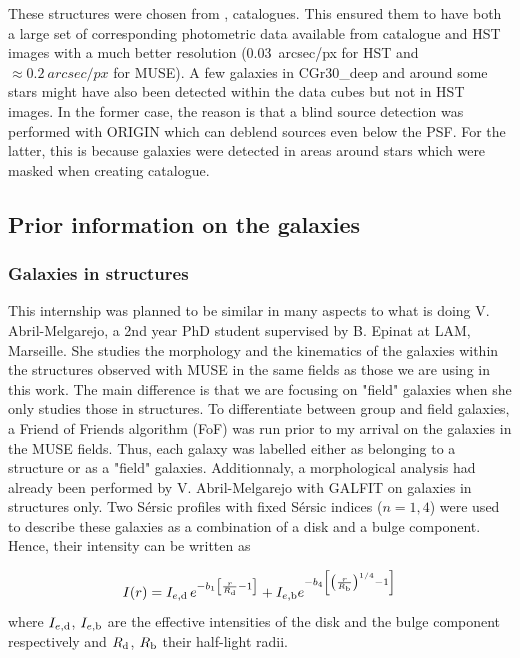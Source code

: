 These structures were chosen from ,  catalogues. This ensured them to have both a large set of corresponding photometric data available from  catalogue and HST images with a much better resolution (\SI{0.03}{arcsec/px} for HST and $\approx \SI{0.2}{arcsec/px}$ for MUSE). A few galaxies in CGr30\_deep and around some stars might have also been detected within the data cubes but not in HST images. In the former case, the reason is that a blind source detection was performed with ORIGIN  which can deblend sources even below the PSF. For the latter, this is because galaxies were detected in areas around stars which were masked when creating  catalogue.

\subsection{Prior information on the galaxies}

\subsubsection{Galaxies in structures}

This internship was planned to be similar in many aspects to what is doing V. Abril-Melgarejo, a 2nd year PhD student supervised by B. Epinat at LAM, Marseille. She studies the morphology and the kinematics of the galaxies within the structures observed with MUSE in the same fields as those we are using in this work. The main difference is that we are focusing on "field" galaxies when she only studies those in structures. To differentiate between group and field galaxies, a Friend of Friends algorithm (FoF) was run prior to my arrival on the galaxies in the MUSE fields. Thus, each galaxy was labelled either as belonging to a structure or as a "field" galaxies. Additionnaly, a morphological analysis had already been performed by V. Abril-Melgarejo with GALFIT on galaxies in structures only. Two Sérsic profiles with fixed Sérsic indices ($n = 1, 4$) were used to describe these galaxies as a combination of a disk and a bulge component. Hence, their intensity can be written as

\begin{equation}
	I(r) = I_{e, \rm{d}} \, e^{-b_1 \left [ \frac{r}{R_{\rm{d}}} -1 \right ]} + I_{e , \rm{b}} e^{- b_4 \left [ \left ( \frac{r}{R_{\rm{b}}} \right )^{1/4} -1 \right ]}
	\label{eq:GALFIT_light_profile}
\end{equation}
where $I_{e, \rm{d}}$, $I_{e, \rm{b}}$ are the effective intensities of the disk and the bulge component respectively and $R_{\rm{d}}$, $R_{\rm{b}}$ their half-light radii.

